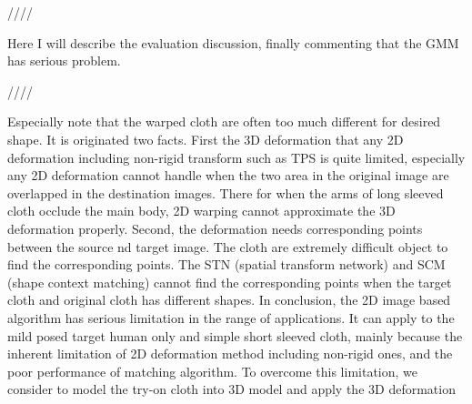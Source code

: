 ////

Here I will describe the evaluation discussion, finally commenting that the GMM has serious problem.

////

Especially note that the warped cloth are often too much different for desired shape. It is originated two facts. First the 3D deformation that any 2D deformation including non-rigid transform such as TPS is quite limited, especially any 2D deformation cannot handle when the two area in the original image are overlapped in the destination images. There for when the arms of long sleeved cloth occlude the main body, 2D warping cannot approximate the 3D deformation properly. Second, the deformation needs corresponding points  between the source nd target image. The cloth are extremely difficult object to find the corresponding points. The STN (spatial transform network)\cite{JaderbergSZK15} and SCM (shape context matching)\cite{BelongieMP02} cannot find the corresponding points when the target cloth and original cloth has different shapes. In conclusion, the 2D image based algorithm has serious limitation in the range of applications. It can apply to the mild posed target human only and simple short sleeved cloth, mainly because the inherent limitation of 2D deformation method including non-rigid ones, and the poor performance of matching algorithm.  To overcome this limitation, we consider to model the try-on cloth into 3D model and apply the 3D deformation



